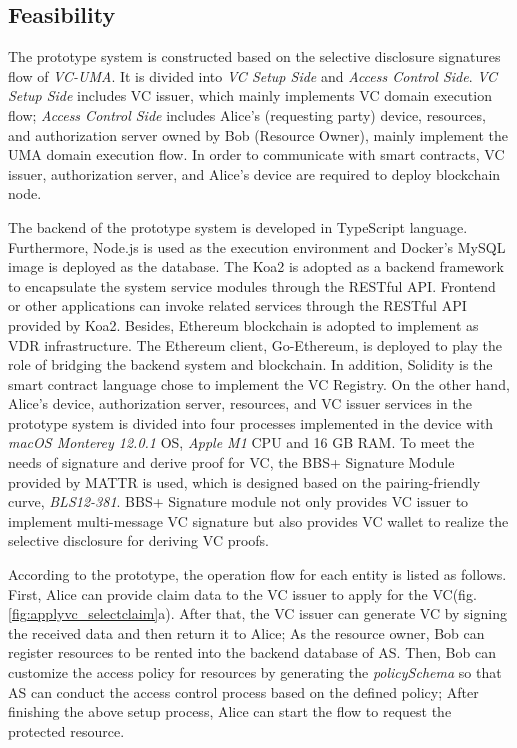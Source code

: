 \documentclass[conference, dvipdfmx]{IEEEtran} %
\begin{document}
\begin{sloppypar}
\subsection{Feasibility}
The prototype system is constructed based on the selective disclosure signatures flow of \textit{VC-UMA}.
It is divided into \textit{VC Setup Side} and \textit{Access Control Side}. \textit{VC Setup Side} includes VC issuer, which mainly implements VC domain execution flow; \textit{Access Control Side} includes Alice's (requesting party) device, resources, and authorization server owned by Bob (Resource Owner), mainly implement the UMA domain execution flow. In order to communicate with smart contracts, VC issuer, authorization server, and Alice's device are required to deploy blockchain node.

The backend of the prototype system is developed in TypeScript language. Furthermore, Node.js is used as the execution environment and Docker's MySQL image is deployed as the database. 
The Koa2 is adopted as a backend framework to encapsulate the system service modules through the RESTful API. Frontend or other applications can invoke related services through the RESTful API provided by Koa2. 
Besides, Ethereum blockchain is adopted to implement as VDR infrastructure. The Ethereum client,  Go-Ethereum\cite{geth}, is deployed to play the role of bridging the backend system and blockchain. In addition, Solidity is the smart contract language chose to implement the VC Registry. 
On the other hand, Alice's device, authorization server, resources, and VC issuer services in the prototype system is divided into four processes implemented in the device with \textit{macOS Monterey 12.0.1} OS, \textit{Apple M1} CPU and 16 GB RAM. To meet the needs of signature and derive proof for VC, the BBS+ Signature Module\cite{bbsplus_github} provided by MATTR is used, which is designed based on the pairing-friendly curve, \textit{BLS12-381}.
BBS+ Signature module not only provides VC issuer to implement multi-message VC signature but also provides VC wallet to realize the selective disclosure for deriving VC proofs. 

According to the prototype, the operation flow for each entity is listed as follows. First, Alice can provide claim data to the VC issuer to apply for the VC(fig. \ref{fig:applyvc_selectclaim}a). 
After that, the VC issuer can generate VC by signing the received data and then return it to Alice;
As the resource owner, Bob can register resources to be rented into the backend database of AS. Then, Bob can customize the access policy for resources by generating the \textit{policySchema} so that AS can conduct the access control process based on the defined policy;
After finishing the above setup process, Alice can start the flow to request the protected resource.


\end{sloppypar}
\end{document}
